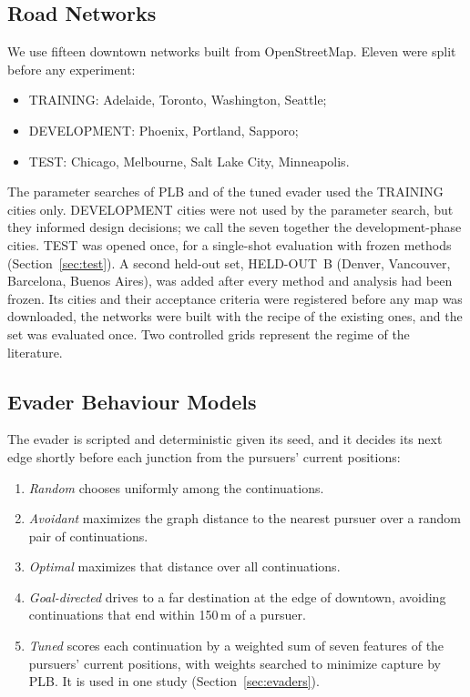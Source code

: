 \documentclass[5p,twocolumn]{elsarticle}
\begin{document}
\subsection{Road Networks}

We use fifteen downtown networks built from OpenStreetMap. Eleven were split before any experiment:
\begin{itemize}
\item TRAINING: Adelaide, Toronto, Washington, Seattle;
\item DEVELOPMENT: Phoenix, Portland, Sapporo;
\item TEST: Chicago, Melbourne, Salt Lake City, Minneapolis.
\end{itemize}
The parameter searches of PLB and of the tuned evader used the TRAINING cities only. DEVELOPMENT cities were not used by the parameter search, but they
informed design decisions; we call the seven together the development-phase cities. TEST was opened once, for a
single-shot evaluation with frozen methods (Section~\ref{sec:test}). A second held-out set, HELD-OUT~B (Denver,
Vancouver, Barcelona, Buenos Aires), was added after every method and analysis had been frozen. Its cities and their
acceptance criteria were registered before any map was downloaded, the networks were built with the recipe of the
existing ones, and the set was evaluated once. Two controlled grids represent the regime of the literature.

\subsection{Evader Behaviour Models}

The evader is scripted and deterministic given its seed, and it decides its next edge shortly before each junction
from the pursuers' current positions:
\begin{enumerate}
\item \emph{Random} chooses uniformly among the continuations.
\item \emph{Avoidant} maximizes the graph distance to the nearest pursuer over a random pair of continuations.
\item \emph{Optimal} maximizes that distance over all continuations.
\item \emph{Goal-directed} drives to a far destination at the edge of downtown, avoiding continuations that end
within 150\,m of a pursuer.
\item \emph{Tuned} scores each continuation by a weighted sum of seven features of the pursuers' current positions,
with weights searched to minimize capture by PLB. It is used in one study (Section~\ref{sec:evaders}).
\end{enumerate}
\end{document}
